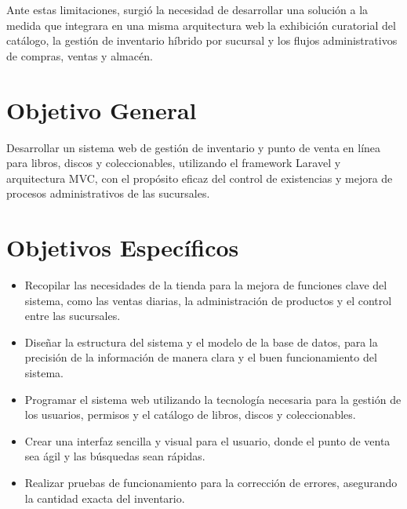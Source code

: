 Ante estas limitaciones, surgió la necesidad de desarrollar una solución a la medida que integrara en una misma arquitectura web la exhibición curatorial del catálogo, la gestión de inventario híbrido por sucursal y los flujos administrativos de compras, ventas y almacén.

\section{Objetivo General}
Desarrollar un sistema web de gestión de inventario y punto de venta en línea para libros, discos y coleccionables, utilizando el framework Laravel y arquitectura MVC, con el propósito eficaz del control de existencias y mejora de procesos administrativos de las sucursales.

\section{Objetivos Específicos}
\begin{itemize}
    \item Recopilar las necesidades de la tienda para la mejora de funciones clave del sistema, como las ventas diarias, la administración de productos y el control entre las sucursales.
    \item Diseñar la estructura del sistema y el modelo de la base de datos, para la precisión de la información de manera clara y el buen funcionamiento del sistema.
    \item Programar el sistema web utilizando la tecnología necesaria para la gestión de los usuarios, permisos y el catálogo de libros, discos y coleccionables.
    \item Crear una interfaz sencilla y visual para el usuario, donde el punto de venta sea ágil y las búsquedas sean rápidas.
    \item Realizar pruebas de funcionamiento para la corrección de errores, asegurando la cantidad exacta del inventario.
\end{itemize}

